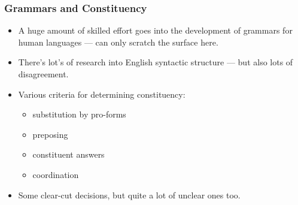 \begin{frame}[fragile]
\frametitle{Grammars and Constituency}

\begin{itemize}
\item A huge amount of skilled effort goes into the development of
  grammars for human languages --- can only scratch the surface here.

\item There's lot's of research into English syntactic structure --- but also lots of disagreement.

\item Various criteria for determining constituency:

  \begin{itemize}
  \item substitution by pro-forms
  \item preposing
  \item constituent answers
  \item coordination
  \end{itemize}

\item Some clear-cut decisions, but quite a lot of unclear ones too.



\end{itemize}

% 

\end{frame}

